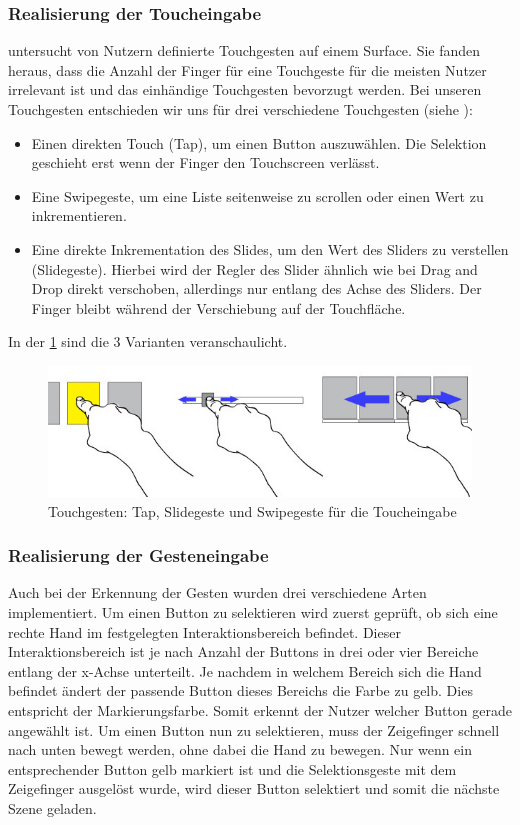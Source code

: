 \subsubsection[Touch]{Realisierung der Toucheingabe} 
\citet{Wobbrock:2009} untersucht von Nutzern definierte Touchgesten auf einem Surface. 
Sie fanden heraus, dass die Anzahl der Finger für eine Touchgeste für die meisten Nutzer irrelevant ist und das einhändige Touchgesten bevorzugt werden. 
Bei unseren Touchgesten entschieden wir uns für drei verschiedene Touchgesten (siehe ):
\begin{itemize}
\item Einen direkten Touch (Tap), um einen Button auszuwählen. 
Die Selektion geschieht erst wenn der Finger den Touchscreen verlässt. 
\item Eine Swipegeste, um eine Liste seitenweise zu scrollen oder einen Wert zu inkrementieren.
\item Eine direkte Inkrementation des Slides, um den Wert des Sliders zu verstellen (Slidegeste).
Hierbei wird der Regler des Slider ähnlich wie bei Drag and Drop direkt verschoben, allerdings nur entlang des Achse des Sliders.
Der Finger bleibt während der Verschiebung auf der Touchfläche.
\end{itemize}
In der \ref{fig:TouchGestures} sind die 3 Varianten veranschaulicht.
\begin{figure}[ht]
	\centering
		\includegraphics[width=1\textwidth]{img/TouchGestures.jpg}
	\caption{Touchgesten: Tap, Slidegeste und Swipegeste für die Toucheingabe}
	\label{fig:TouchGestures}
\end{figure}

\subsubsection[Geste]{Realisierung der Gesteneingabe}
Auch bei der Erkennung der Gesten wurden drei verschiedene Arten implementiert. 
Um einen Button zu selektieren wird zuerst geprüft, ob sich eine rechte Hand im festgelegten Interaktionsbereich befindet. 
Dieser Interaktionsbereich ist je nach Anzahl der Buttons in drei oder vier Bereiche entlang der x-Achse unterteilt. 
Je nachdem in welchem Bereich sich die Hand befindet ändert der passende Button dieses Bereichs die Farbe zu gelb.
Dies entspricht der Markierungsfarbe. 
Somit erkennt der Nutzer welcher Button gerade angewählt ist. 
Um einen Button nun zu selektieren, muss der Zeigefinger schnell nach unten bewegt werden, ohne dabei die Hand zu bewegen. 
Nur wenn ein entsprechender Button gelb markiert ist und die Selektionsgeste mit dem Zeigefinger ausgelöst wurde, wird dieser Button selektiert und somit die nächste Szene geladen. 

